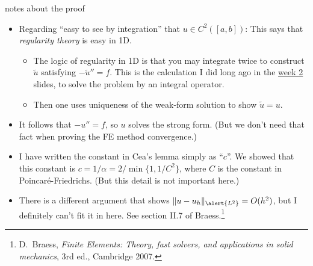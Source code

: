 \documentclass[10pt,
               svgnames,
               hyperref={colorlinks,
                         citecolor=DeepPink4,
                         linkcolor=FireBrick,
                         urlcolor=blue},
               usepdftitle=false]{beamer}
\begin{document}
\begin{frame}{notes about the proof}

\begin{itemize}
\item Regarding ``easy to see by integration'' that $u\in C^2([a,b])$:  This says that \alert{\emph{regularity theory}} is easy in 1D.
    \begin{itemize}
    \item[$\circ$] The logic of regularity in 1D is that you may integrate twice to construct $\tilde u$ satisfying $-\tilde u''=f$.  This is the calculation I did long ago in the \href{https://bueler.github.io/fa/assets/slides/S26/week2.pdf}{week 2} slides, to solve the problem by an integral operator.
    \item[$\circ$] Then one uses uniqueness of the weak-form solution to show $\tilde u=u$.
    \end{itemize}

\item It follows that $-u''=f$, so $u$ solves the strong form.  (But we don't need that fact when proving the FE method convergence.)
\item I have written the constant in Cea's lemma simply as ``$c$''.  We showed that this constant is $c=1/\alpha=2/\min\{1,1/C^2\}$, where $C$ is the constant in Poincar\'e-Friedrichs.  (But this detail is not important here.)
\item There is a different argument that shows $\|u-u_h\|_{\alert{L^2}}=O(h^2)$, but I definitely can't fit it in here.  See section II.7 of Braess.\footnote{D.~Braess, \emph{Finite Elements: Theory, fast solvers, and applications in solid mechanics}, 3rd ed., Cambridge 2007.}
\end{itemize}
\end{frame}
\end{document}
